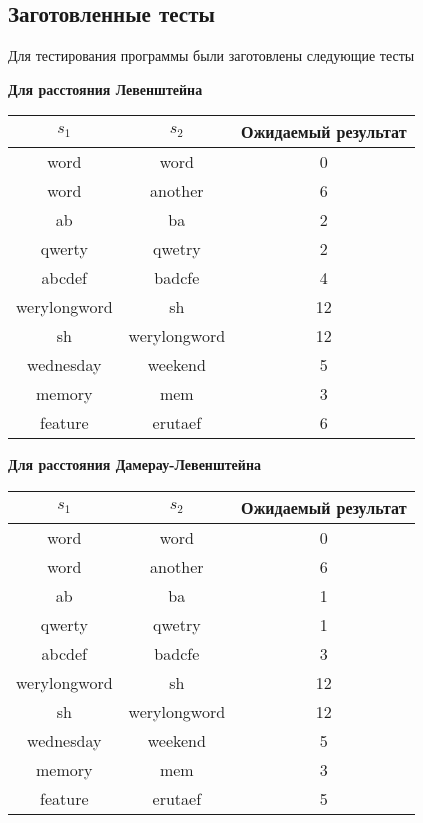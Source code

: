 ﻿\documentclass[a4paper,12pt]{article}
\begin{document}
    \subsection{Заготовленные тесты}

    Для тестирования программы были заготовлены следующие тесты

    \hfill

    \textbf{Для расстояния Левенштейна}

    \begin{tabular}{|c|c|c|}
        \hline
        $s_1$ & $s_2$ & Ожидаемый результат \\
        \hline
        word & word & 0 \\
        \hline
        word & another & 6 \\
        \hline
        ab & ba & 2 \\
        \hline
        qwerty & qwetry & 2 \\
        \hline
        abcdef & badcfe & 4 \\
        \hline
        werylongword & sh & 12 \\
        \hline
        sh & werylongword & 12 \\
        \hline
        wednesday & weekend & 5 \\
        \hline
        memory & mem & 3 \\
        \hline
        feature & erutaef & 6 \\
        \hline
    \end{tabular}

    \hfill

    \hfill

    \textbf{Для расстояния Дамерау-Левенштейна}

    \begin{tabular}{|c|c|c|}
        \hline
        $s_1$ & $s_2$ & Ожидаемый результат \\
        \hline
        word & word & 0 \\
        \hline
        word & another & 6 \\
        \hline
        ab & ba & 1 \\
        \hline
        qwerty & qwetry & 1 \\
        \hline
        abcdef & badcfe & 3 \\
        \hline
        werylongword & sh & 12 \\
        \hline
        sh & werylongword & 12 \\
        \hline
        wednesday & weekend & 5 \\
        \hline
        memory & mem & 3 \\
        \hline
        feature & erutaef & 5 \\
        \hline
    \end{tabular}
\end{document}
